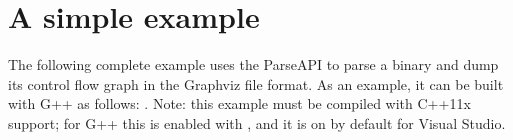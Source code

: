 \section{A simple example}
\label{sec:example}

The following complete example uses the ParseAPI to parse a binary and
dump its control flow graph in the Graphviz file format. As an
example, it can be built with G++ as follows: . Note: this example must be compiled with C++11x support;
for G++ this is enabled with , and it is on by
default for Visual Studio.

\lstset{numbers=left, numberstyle=\tiny, stepnumber=5, numbersep=5pt}
\lstset{showstringspaces=false}

